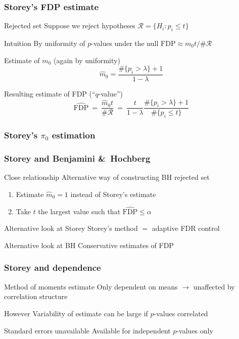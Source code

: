 \documentclass[xcolor={pdftex,dvipsnames,table}]{beamer}
\newcommand{\bb}[1]{\begin{block}{#1}}
\newcommand{\eb}{\end{block}}
\newcommand{\be}{\begin {enumerate}}
\newcommand{\ee}{\end{enumerate}}
\newcommand{\bfr}[1]{\begin{frame} \frametitle{#1}}
\begin{document}
\bfr{Storey's FDP estimate}
  \bb{Rejected set}
    Suppose we reject hypotheses $\mathcal{R} = \{H_i: p_i \leq t\}$
  \eb
  \bb{Intuition}
    By uniformity of $p$-values under the null $\mathrm{FDP} \approx m_0t/\#\mathcal{R}$
  \eb
  \bb{Estimate of $m_0$ (again by uniformity)}
  \[ \hat{m}_0 = \frac{ \#\{p_i > \lambda\}+1}{1-\lambda} \]
  \eb
  \bb{Resulting estimate of FDP (``$q$-value'')}
\[    \hat{\mathrm{FDP}}\ =\ \frac{\hat{m}_0t}{\#\mathcal{R}}\ =\ \frac{t}{1-\lambda}\frac{\#\{p_i > \lambda\}+1}{\#\{p_i \leq t\}} \]
  \eb
\end{frame}


\bfr{Storey's $\pi_0$ estimation}
\end{frame}


\bfr{Storey and Benjamini \&\ Hochberg}
  \bb{Close relationship}
    Alternative way of constructing BH rejected set
    \be
      \item Estimate $\hat m_0 = 1$ instead of Storey's estimate
      \item Take $t$ the largest value such that $\hat{\mathrm{FDP}} \leq \alpha$
    \ee
  \eb
  \bb{Alternative look at Storey}
    Storey's method $=$ adaptive FDR control
  \eb
  \bb{Alternative look at BH}
    Conservative estimates of FDP
  \eb
\end{frame}


\bfr{Storey and dependence}
  \bb{Method of moments estimate}
    Only dependent on means $\to$ unaffected by correlation structure
  \eb
  \bb{However}
    Variability of estimate can be large if $p$-values correlated
  \eb
  \bb{Standard errors unavailable}
    Available for independent $p$-values only
  \eb
\end{frame}
\end{document}
